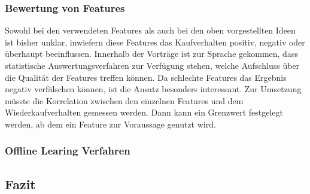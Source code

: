 \subsubsection{Bewertung von Features}	
Sowohl bei den verwendeten Features als auch bei den oben vorgestellten Ideen ist bisher unklar, inwiefern diese Features das Kaufverhalten positiv, negativ oder überhaupt beeinflussen.
Innerhalb der Vorträge ist zur Sprache gekommen, dass statistische Auswertungsverfahren zur Verfügung stehen, welche Aufschluss über die Qualität der Features treffen können. Da schlechte Features das Ergebnis negativ verfälschen können, ist die Ansatz besonders interessant.
Zur Umsetzung müsste die Korrelation zwischen den einzelnen Features
und dem Wiederkaufverhalten gemessen werden.
Dann kann ein Grenzwert festgelegt werden, ab dem ein Feature
zur Voraussage genutzt wird.

\subsubsection{Offline Learing Verfahren}	
	

\subsection{Fazit}

